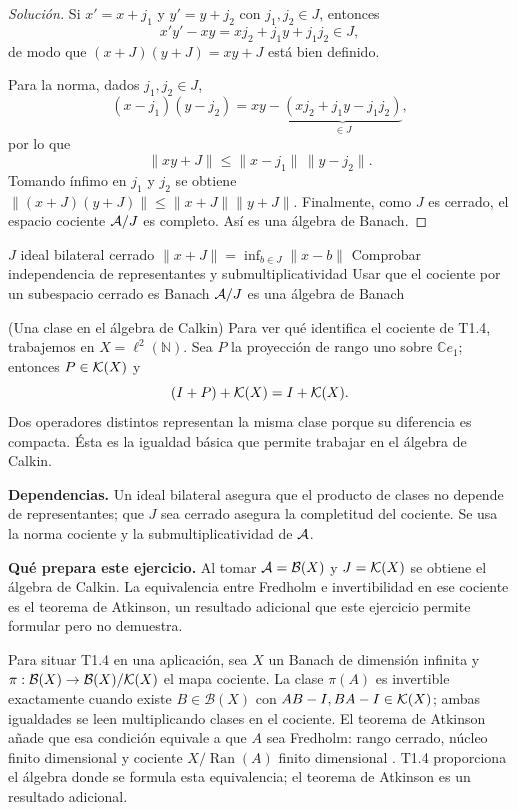 \begin{proof}[Solución]
Si $x'=x+j_1$ y $y'=y+j_2$ con $j_1,j_2\in J$, entonces
\[
 x'y'-xy=xj_2+j_1y+j_1j_2\in J,
\]
de modo que $(x+J)(y+J)=xy+J$ está bien definido.

Para la norma, dados $j_1,j_2\in J$,
\[
(x-j_1)(y-j_2)=xy-\underbrace{(xj_2+j_1y-j_1j_2)}_{\in J},
\]
por lo que
\[
\|xy+J\|\le\|x-j_1\|\,\|y-j_2\|.
\]
Tomando ínfimo en $j_1$ y $j_2$ se obtiene
$\|(x+J)(y+J)\|\le\|x+J\|\|y+J\|$. Finalmente, como $J$ es cerrado, el espacio cociente
$\mathcal A/J$ es completo. Así es una álgebra de Banach.
\end{proof}

\proofdiagrambranch
{$J$ ideal bilateral cerrado}
{$\|x+J\|=\inf_{b\in J}\|x-b\|$}
{Comprobar independencia de representantes y submultiplicatividad}
{Usar que el cociente por un subespacio cerrado es Banach}
{$\mathcal A/J$ es una álgebra de Banach}

\begin{cthejemplo}{(Una clase en el álgebra de Calkin)}
Para ver qué identifica el cociente de T1.4, trabajemos en $X=\ell^2(\mathbb N)$.
Sea $P$ la proyección de rango uno sobre $\mathbb C e_1$; entonces $P\in\mathcal K(X)$ y
\[
 (I+P)+\mathcal K(X)=I+\mathcal K(X).
\]
Dos operadores distintos representan la misma clase porque su diferencia es compacta.
Ésta es la igualdad básica que permite trabajar en el álgebra de Calkin.
\end{cthejemplo}

\noindent\textbf{Dependencias.} Un ideal bilateral asegura que el producto de clases no depende de representantes; que $J$ sea cerrado asegura la completitud del cociente. Se usa la norma cociente y la submultiplicatividad de $\mathcal A$.

\noindent\textbf{Qué prepara este ejercicio.} Al tomar $\mathcal A=\mathcal B(X)$ y $J=\mathcal K(X)$ se obtiene el álgebra de Calkin. La equivalencia entre Fredholm e invertibilidad en ese cociente es el teorema de Atkinson, un resultado adicional que este ejercicio permite formular pero no demuestra.

\begin{investigacion}[title={Fredholm en el álgebra de Calkin}]
Para situar T1.4 en una aplicación, sea $X$ un Banach de dimensión infinita y
$\pi:\mathcal B(X)\to\mathcal B(X)/\mathcal K(X)$ el mapa cociente.
La clase $\pi(A)$ es invertible exactamente cuando existe $B\in\mathcal B(X)$ con
$AB-I,BA-I\in\mathcal K(X)$; ambas igualdades se leen multiplicando clases en el cociente.
El teorema de Atkinson añade que esa condición equivale a que $A$ sea Fredholm: rango
cerrado, núcleo finito dimensional y cociente $X/\operatorname{Ran}(A)$ finito dimensional
\cite[p.~2]{Karlovich2025}. T1.4 proporciona el álgebra donde se formula esta
equivalencia; el teorema de Atkinson es un resultado adicional.
\end{investigacion}

